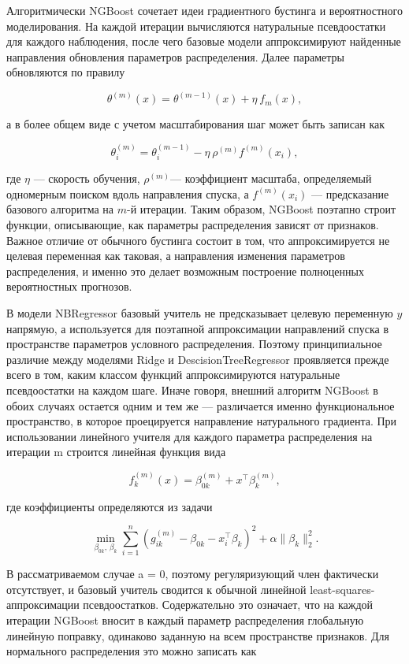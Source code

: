 \documentclass[
]{article}
\begin{document}
Алгоритмически NGBoost сочетает идеи градиентного бустинга и вероятностного моделирования. На каждой итерации вычисляются натуральные псевдоостатки для каждого наблюдения, после чего базовые модели аппроксимируют найденные направления обновления параметров распределения. Далее параметры обновляются по правилу

\[\theta^{(m)}(x) = \theta^{\left( m-1 \right)}(x) + \eta\text{ }f_{m}(x),\]

а в более общем виде с учетом масштабирования шаг может быть записан как

\[\theta_{i}^{(m)} = \theta_{i}^{\left( m-1 \right)} - \eta\text{ }\rho^{(m)}f^{(m)}(x_{i}),\]

где \(\eta\) --- скорость обучения, \(\rho^{(m)}\)--- коэффициент масштаба, определяемый одномерным поиском вдоль направления спуска, а \(f^{(m)}(x_{i})\) --- предсказание базового алгоритма на \(m\)-й итерации. Таким образом, NGBoost поэтапно строит функции, описывающие, как параметры распределения зависят от признаков. Важное отличие от обычного бустинга состоит в том, что аппроксимируется не целевая переменная как таковая, а направления изменения параметров распределения, и именно это делает возможным построение полноценных вероятностных прогнозов.

В модели NBRegressor базовый учитель не предсказывает целевую переменную \(y\)напрямую, а используется для поэтапной аппроксимации направлений спуска в пространстве параметров условного распределения. Поэтому принципиальное различие между моделями Ridge и DescisionTreeRegressor проявляется прежде всего в том, каким классом функций аппроксимируются натуральные псевдоостатки на каждом шаге. Иначе говоря, внешний алгоритм NGBoost в обоих случаях остается одним и тем же --- различается именно функциональное пространство, в которое проецируется направление натурального градиента. При использовании линейного учителя для каждого параметра распределения на итерации m строится линейная функция вида

\[f_{k}^{(m)}(x) = \beta_{0k}^{(m)} + x^{\top}\beta_{k}^{(m)},\]

где коэффициенты определяются из задачи

\[\underset{\beta_{0k},\text{ }\beta_{k}}{\min}\sum_{i = 1}^{n}\left( g_{ik}^{(m)}-\beta_{0k}-x_{i}^{\top}\beta_{k} \right)^{2} + \alpha \parallel \beta_{k} \parallel_{2}^{2}.\]

В рассматриваемом случае a = 0, поэтому регуляризующий член фактически отсутствует, и базовый учитель сводится к обычной линейной least-squares-аппроксимации псевдоостатков. Содержательно это означает, что на каждой итерации NGBoost вносит в каждый параметр распределения глобальную линейную поправку, одинаково заданную на всем пространстве признаков. Для нормального распределения это можно записать как
\end{document}
